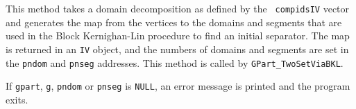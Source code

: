 \begin{enumerate}
\begin{verbatim}
\end{verbatim}
This method takes a domain decomposition as defined by the {\tt
compidsIV} vector and generates the map from the vertices to the
domains and segments that are used in the Block Kernighan-Lin
procedure to find an initial separator.
The map is returned in an {\tt IV} object, and the numbers of
domains and segments are set in the {\tt pndom} and {\tt pnseg}
addresses.
This method is called by {\tt GPart\_TwoSetViaBKL}.
\par {}
If {\tt gpart}, {\tt g}, {\tt pndom} or {\tt pnseg} is {\tt NULL},
an error message is printed and the program exits.
\end{enumerate}
\par
